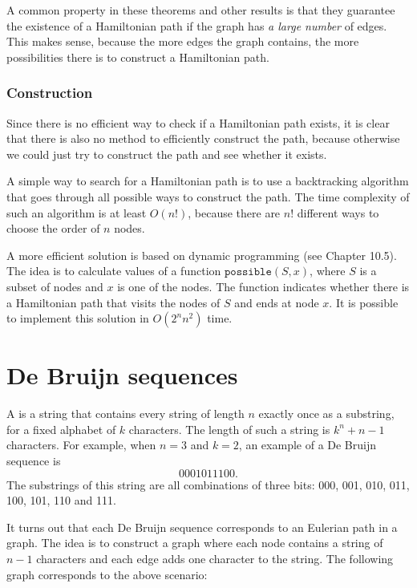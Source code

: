 A common property in these theorems and other results is
that they guarantee the existence of a Hamiltonian path
if the graph has \emph{a large number} of edges.
This makes sense, because the more edges the graph contains,
the more possibilities there is to construct a Hamiltonian path.

\subsubsection{Construction}

Since there is no efficient way to check if a Hamiltonian
path exists, it is clear that there is also no method
to efficiently construct the path, because otherwise
we could just try to construct the path and see
whether it exists.

A simple way to search for a Hamiltonian path is
to use a backtracking algorithm that goes through all
possible ways to construct the path.
The time complexity of such an algorithm is at least $O(n!)$,
because there are $n!$ different ways to choose the order of $n$ nodes.

A more efficient solution is based on dynamic programming
(see Chapter 10.5).
The idea is to calculate values
of a function $\texttt{possible}(S,x)$,
where $S$ is a subset of nodes and $x$
is one of the nodes.
The function indicates whether there is a Hamiltonian path
that visits the nodes of $S$ and ends at node $x$.
It is possible to implement this solution in $O(2^n n^2)$ time.

\section{De Bruijn sequences}


A 
is a string that contains
every string of length $n$
exactly once as a substring, for a fixed
alphabet of $k$ characters.
The length of such a string is 
$k^n+n-1$ characters.
For example, when $n=3$ and $k=2$,
an example of a De Bruijn sequence is
\[0001011100.\]
The substrings of this string are all
combinations of three bits:
000, 001, 010, 011, 100, 101, 110 and 111.

It turns out that each De Bruijn sequence
corresponds to an Eulerian path in a graph.
The idea is to construct a graph where
each node contains a string of $n-1$ characters
and each edge adds one character to the string.
The following graph corresponds to the above scenario:

